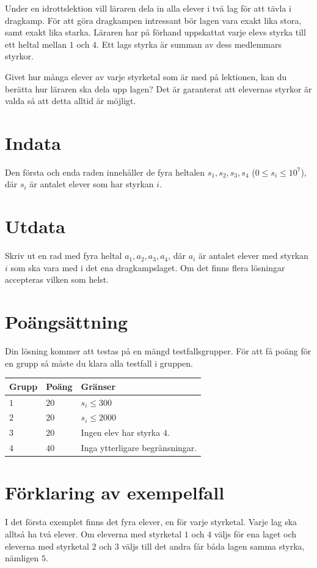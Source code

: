 Under en idrottslektion vill läraren dela in alla elever i två lag för att tävla i dragkamp.
För att göra dragkampen intressant bör lagen vara exakt lika stora, samt exakt lika starka.
Läraren har på förhand uppskattat varje elevs styrka till ett heltal mellan $1$ och $4$.
Ett lags styrka är summan av dess medlemmars styrkor.

Givet hur många elever av varje styrketal som är med på lektionen, kan du berätta hur läraren ska dela upp lagen?
Det är garanterat att elevernas styrkor är valda så att detta alltid är möjligt.

\section*{Indata}
Den första och enda raden innehåller de fyra heltalen $s_1, s_2, s_3, s_4$ ($0 \le s_i \le 10^{7}$), där $s_i$ är antalet elever som har styrkan $i$.

\section*{Utdata}
Skriv ut en rad med fyra heltal $a_1, a_2, a_3, a_4$, där $a_i$ är antalet elever med styrkan $i$ som ska vara med i det ena dragkampslaget.
Om det finns flera lösningar accepteras vilken som helst.

\section*{Poängsättning}
Din lösning kommer att testas på en mängd testfallsgrupper.
För att få poäng för en grupp så måste du klara alla testfall i gruppen.

\noindent
\begin{tabular}{| l | l | p{12cm} |}
  \hline
  \textbf{Grupp} & \textbf{Poäng} & \textbf{Gränser} \\ \hline
  $1$    & $20$      & $s_i \le 300$ \\ \hline
  $2$    & $20$      & $s_i \le 2000$ \\ \hline
  $3$    & $20$      & Ingen elev har styrka $4$. \\ \hline
  $4$    & $40$      & Inga ytterligare begränsningar. \\ \hline
\end{tabular}

\section*{Förklaring av exempelfall}
I det första exemplet finns det fyra elever, en för varje styrketal.
Varje lag ska alltså ha två elever.
Om eleverna med styrketal $1$ och $4$ väljs för ena laget och eleverna med styrketal $2$ och $3$ väljs till det andra får båda lagen samma styrka, nämligen $5$.
